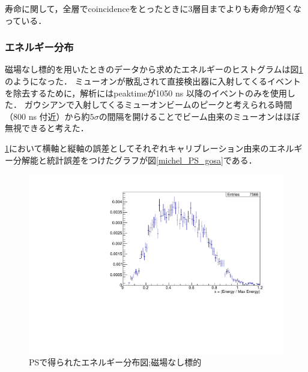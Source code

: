   寿命に関して，全層でcoincidenceをとったときに3層目までよりも寿命が短くなっている．

  
  \subsubsection{エネルギー分布}
  磁場なし標的を用いたときのデータから求めたエネルギーのヒストグラムは図\ref{michel_PS}のようになった．
  ミューオンが散乱されて直接検出器に入射してくるイベントを除去するために，解析にはpeaktimeが1050 ns 以降のイベントのみを使用した．
  ガウシアンで入射してくるミューオンビームのピークと考えられる時間（800 ns 付近）から約$5\sigma$の間隔を開けることでビーム由来のミューオンはほぼ無視できると考えた．
  
  \ref{michel_PS}において横軸と縦軸の誤差としてそれぞれキャリブレーション由来のエネルギー分解能と統計誤差をつけたグラフが図\ref{michel_PS_gosa}である．
  \begin{figure}[H]
   \centering
   \includegraphics[height = 0.7\columnwidth , angle = -90]{figure/ikemitsu/michel_PS.pdf}
   \caption{PSで得られたエネルギー分布図;磁場なし標的}
   \label{michel_PS}
  \end{figure}
  

